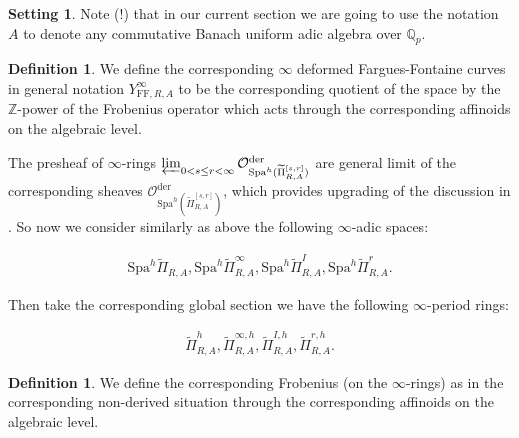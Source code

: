 \documentclass[12pt]{amsart}
\theoremstyle{definition}
\newtheorem{definition}[theorem]{Definition}
\numberwithin{equation}{section}
\newtheorem{setting}[theorem]{Setting}
\begin{document}
\begin{setting}
Note (!) that in our current section we are going to use the notation $A$ to denote any commutative Banach uniform adic algebra over $\mathbb{Q}_p$.
\end{setting}





\begin{definition}
We define the corresponding $\infty$ deformed Fargues-Fontaine curves in general notation $Y^\infty_{\mathrm{FF},R,A}$ to be the corresponding quotient of the space by the $\mathbb{Z}$-power of the Frobenius operator which acts through the corresponding affinoids on the algebraic level.	
\end{definition}



\indent The presheaf of $\infty$-rings $\varprojlim_{0<s\leq r< \infty}\mathcal{O}^\mathrm{der}_{\mathrm{Spa}^h(\widetilde{\Pi}^{[s,r]}_{R,A})}$ are general limit of the corresponding sheaves $\mathcal{O}^\mathrm{der}_{\mathrm{Spa}^h(\widetilde{\Pi}^{[s,r]}_{R,A})}$, which provides upgrading of the discussion in \cite{T2}. So now we consider similarly as above the following $\infty$-adic spaces:

\begin{align}
\mathrm{Spa}^h\widetilde{\Pi}_{R,A},\mathrm{Spa}^h\widetilde{\Pi}^\infty_{R,A},\mathrm{Spa}^h\widetilde{\Pi}^I_{R,A},\mathrm{Spa}^h\widetilde{\Pi}^r_{R,A}.	
\end{align}


\indent Then take the corresponding global section we have the following $\infty$-period rings:

\begin{align}
\widetilde{\Pi}^h_{R,A},\widetilde{\Pi}^{\infty,h}_{R,A},\widetilde{\Pi}^{I,h}_{R,A},\widetilde{\Pi}^{r,h}_{R,A}.	
\end{align}

\begin{definition}
We define the corresponding Frobenius (on the $\infty$-rings) as in the corresponding non-derived situation through the corresponding affinoids on the algebraic level.	
\end{definition}



\end{document}
